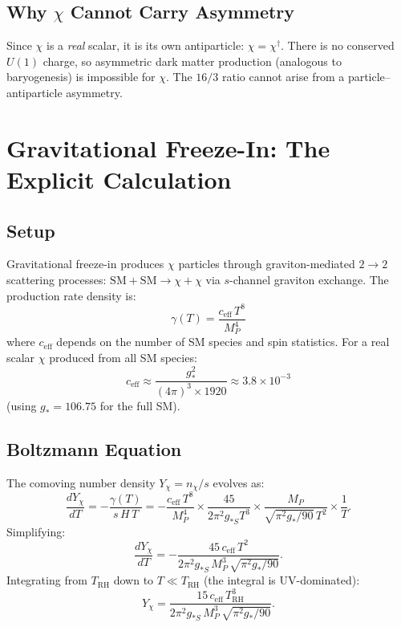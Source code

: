 \documentclass[11pt]{article}
\theoremstyle{definition}
\theoremstyle{remark}
\newcommand{\MP}{M_P}
\begin{document}
\subsection{Why $\chi$ Cannot Carry Asymmetry}

Since $\chi$ is a \emph{real} scalar, it is its own antiparticle:
$\chi = \chi^\dagger$. There is no conserved $U(1)$ charge, so asymmetric
dark matter production (analogous to baryogenesis) is impossible for $\chi$.
The $16/3$ ratio cannot arise from a particle--antiparticle asymmetry.


\section{Gravitational Freeze-In: The Explicit Calculation}
\label{sec:freezein}

\subsection{Setup}

Gravitational freeze-in produces $\chi$ particles through graviton-mediated
$2 \to 2$ scattering processes: $\mathrm{SM} + \mathrm{SM} \to \chi + \chi$
via $s$-channel graviton exchange. The production rate density is:
\begin{equation}
  \gamma(T) = \frac{c_\mathrm{eff}\,T^8}{\MP^4}
\end{equation}
where $c_\mathrm{eff}$ depends on the number of SM species and spin
statistics. For a real scalar $\chi$ produced from all SM species:
\begin{equation}
  c_\mathrm{eff} \approx \frac{g_*^2}{(4\pi)^3 \times 1920} \approx 3.8 \times 10^{-3}
\end{equation}
(using $g_* = 106.75$ for the full SM).

\subsection{Boltzmann Equation}

The comoving number density $Y_\chi = n_\chi/s$ evolves as:
\begin{equation}
  \frac{dY_\chi}{dT} = -\frac{\gamma(T)}{s\,H\,T}
  = -\frac{c_\mathrm{eff}\,T^8}{\MP^4}
  \times \frac{45}{2\pi^2 g_{*S} T^3}
  \times \frac{\MP}{\sqrt{\pi^2 g_*/90}\,T^2}
  \times \frac{1}{T}.
\end{equation}
Simplifying:
\begin{equation}
  \frac{dY_\chi}{dT} = -\frac{45\,c_\mathrm{eff}\,T^2}{2\pi^2 g_{*S}\,\MP^3\,\sqrt{\pi^2 g_*/90}}.
\end{equation}
Integrating from $T_\mathrm{RH}$ down to $T \ll T_\mathrm{RH}$
(the integral is UV-dominated):
\begin{equation}
  Y_\chi = \frac{15\,c_\mathrm{eff}\,T_\mathrm{RH}^3}{2\pi^2 g_{*S}\,\MP^3\,\sqrt{\pi^2 g_*/90}}.
\end{equation}
\end{document}
